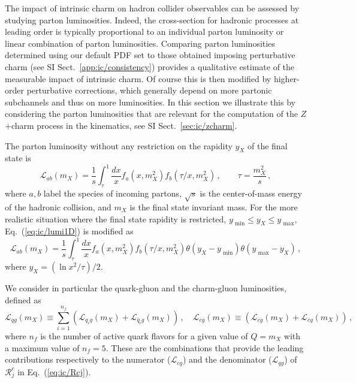 The impact of intrinsic charm on hadron collider observables can be
assessed by studying  parton luminosities. Indeed, the
cross-section for hadronic processes at leading order is typically
proportional to an individual parton luminosity or linear combination
of parton luminosities.
%
Comparing parton luminosities determined
using our default PDF set to those obtained imposing perturbative
charm (see SI Sect.~\ref{app:ic/consistency}) provides a qualitative estimate of the
measurable impact of intrinsic charm. Of course this is then modified
by higher-order
perturbative corrections, which generally depend on more partonic
subchannels and thus on more luminosities.
%
In this section we illustrate this by considering the parton
luminosities that are relevant for the computation of the
$Z$+charm process in the \lhcb kinematics, see SI Sect.~\ref{sec:ic/zcharm}.

The parton luminosity without any restriction on the rapidity $y_X$ of the final state is
\begin{equation}
\label{eq:ic/lumi1D}
\mathcal{L}_{ab}(m_X)= \frac{1}{s}\int_{\tau}^1 \frac{dx}{x}f_a \left( x,m_X^2\right)
f_b\left( \tau/x,m_X^2\right) \, ,\qquad
\tau=\frac{m_X^2}{s} \, ,
\end{equation}
where $a,b$ label the species of incoming partons, $\sqrt{s}$ is the center-of-mass energy of
the hadronic collision, and $m_X$ is the final state invariant mass.
%
For the more realistic situation where the final state rapidity
is restricted, $y_\textrm{ min}\le y_X\le y_\textrm{ max}$,
Eq.~(\ref{eq:ic/lumi1D}) is modified as
\begin{equation}
\label{eq:ic/lumi1D_restricted}
\mathcal{L}_{ab}(m_X)= \frac{1}{s}\int_{\tau}^1 \frac{dx}{x}f_a \left( x,m_X^2\right)
f_b\left( \tau/x,m_X^2\right) \theta\left( y_X-y_\textrm{ min}  \right)
\theta\left( y_\textrm{ max}-y_X  \right)\, , 
\end{equation}
where $y_X = \left( \ln x^2/\tau \right) /2$.

We consider in particular the quark-gluon and the charm-gluon luminosities, defined as
\begin{equation}
\label{eq:ic/lumis}
\mathcal{L}_{qg}(m_X)\equiv \sum_{i=1}^{n_f} \left( \mathcal{L}_{q_ig}(m_X)+
\mathcal{L}_{\bar{q}_ig}(m_X) \right)\, , \quad
\mathcal{L}_{cg}(m_X)\equiv  \left( \mathcal{L}_{cg}(m_X)+
\mathcal{L}_{\bar{c}g}(m_X) \right)\, , 
\end{equation}
where $n_f$ is the number of active quark flavors for a given value of $Q=m_X$
with a maximum value of $n_f=5$.
%
These are the combinations that provide the leading contributions
respectively to the numerator ($\mathcal{L}_{cg}$) and the 
denominator
($\mathcal{L}_{qg}$) of  $\mathcal{R}_j^c$ in Eq.~(\ref{eq:ic/Rcj}). 

